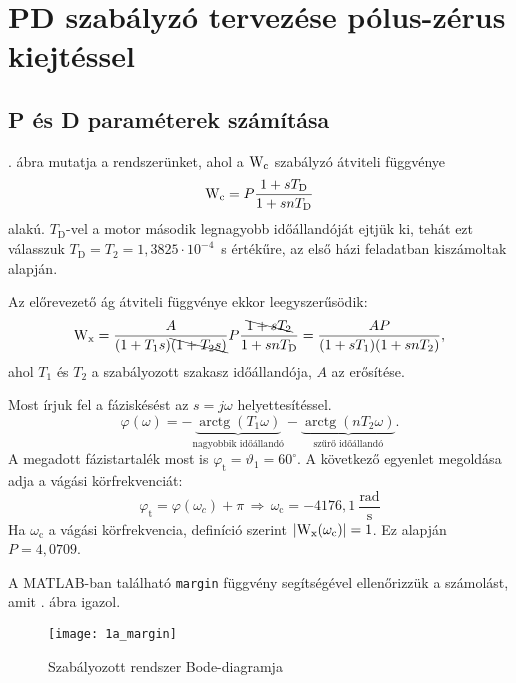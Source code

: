 \section{PD szabályzó tervezése pólus-zérus kiejtéssel}

\subsection{P és D paraméterek számítása}

. ábra mutatja a rendszerünket, ahol a $ \mathrm{W}_\text{c} $ szabályzó átviteli függvénye
\begin{equation}
	\mathrm{W}_\text{c} = P\frac{1+sT_\text{D}}{1+snT_\text{D}}
\end{equation}
alakú.
$T_\text{D}$-vel a motor második legnagyobb időállandóját ejtjük ki, tehát ezt válasszuk \mbox{$T_\text{D}=T_2=1,3825\cdot 10^{-4}$ s} értékűre,
az első házi feladatban kiszámoltak alapján.

Az előrevezető ág átviteli függvénye ekkor leegyszerűsödik:
\begin{equation}
	\mathrm{W}_\text{x}
	= \frac{A}{(1+T_1s)\bcancel{(1+T_2s)}}P\frac{\bcancel{1+sT_\text{2} }}{1+snT_\text{D}}
	= \frac{AP}{(1+sT_1)(1+snT_2)},
\end{equation}
ahol $T_1$ és $T_2$ a szabályozott szakasz időállandója, $A$ az erősítése.

Most írjuk fel a fáziskésést az $s=j\omega$ helyettesítéssel.
\begin{equation}
	\varphi(\omega) = -\underbrace{\operatorname{arctg}(T_1\omega)}_\text{nagyobbik időállandó} -\underbrace{\operatorname{arctg}(nT_2\omega)}_\text{szűrő időállandó}.
\end{equation}
A megadott fázistartalék most is $\varphi_\text{t} = \vartheta_1=60^\circ$. A következő egyenlet megoldása adja a vágási
körfrekvenciát:
\begin{equation}
	\varphi_\text{t} = \varphi(\omega_c) +\pi \,\Rightarrow\, \omega_\text{c} = -4176,1~\frac{\text{rad}}{\text{s}}
\end{equation}
Ha $\omega_\text{c}$ a vágási körfrekvencia, definíció szerint $\left\lvert \mathrm{W}_\text{x}(\omega_\text{c}) \right\rvert = 1$.
Ez alapján $ P = 4,0709$.

A MATLAB-ban található \verb|margin| függvény segítségével ellenőrizzük a számolást, amit . ábra igazol.
\begin{figure}[H]
	\centering
	\texttt{[image: 1a\_margin]}
	\caption{Szabályozott rendszer Bode-diagramja}
	\label{fig:1a_margin}
\end{figure}

